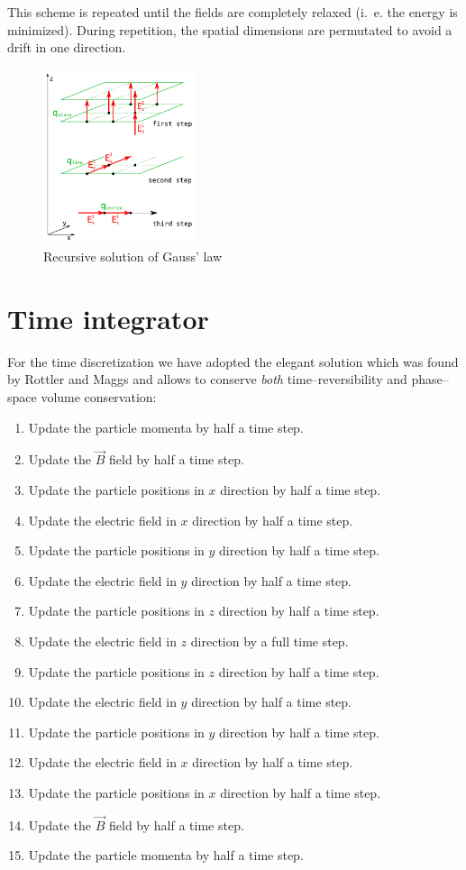 This scheme is repeated until the fields are completely relaxed
(i.~e. the energy is minimized). During repetition, the spatial
dimensions are permutated to avoid a drift in one direction.

\begin{figure}[ht]
  \centering \includegraphics[width=0.4\textwidth]{figures/maggs-initial-scheme}
  \caption{Recursive solution of Gauss' law}
  \label{fig:maggs-initialization}
\end{figure} 

\section{Time integrator}

For the time discretization we have adopted the elegant solution which was found by
Rottler and Maggs \cite{maggs02a} and allows to conserve {\em both}
time--reversibility and phase--space volume conservation:

\begin{enumerate}
\item Update the particle momenta by half a time step.
\item Update the $\vec B$ field by half a time step.
\item Update the particle positions in $x$ direction by half a time
  step.
\item Update the electric field in $x$ direction by half a time step.
\item Update the particle positions in $y$ direction by half a time
  step.
\item Update the electric field in $y$ direction by half a time step.
\item Update the particle positions in $z$ direction by half a time
  step.
\item Update the electric field in $z$ direction by a full time step.
\item Update the particle positions in $z$ direction by half a time
  step.
\item Update the electric field in $y$ direction by half a time step.
\item Update the particle positions in $y$ direction by half a time
  step.
\item Update the electric field in $x$ direction by half a time step.
\item Update the particle positions in $x$ direction by half a time
  step.
\item Update the $\vec B$ field by half a time step.
\item Update the particle momenta by half a time step.
\end{enumerate}

